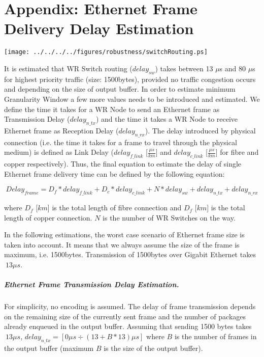 \chapter{Appendix: Ethernet Frame Delivery Delay Estimation}
\label{appH}

\begin{center}
	\texttt{[image: ../../../../figures/robustness/switchRouting.ps]}
	\label{fig:swRouting}
\end{center}

It is estimated that WR Switch routing ($delay_{sw}$) takes between
13 $\mu$s and 80 $\mu$s for highest priority traffic (size: 1500bytes), provided
no traffic congestion occurs and depending on the size of output buffer. In
order to estimate minimum Granularity Window a few more values needs to be
introduced and estimated. We define the time it takes for a WR Node to send an
Ethernet frame as Transmission Delay ($delay_{n\_tx}$) and the time it takes a
WR Node to receive Ethernet frame as Reception Delay ($delay_{n\_rx}$). The
delay introduced by physical connection (i.e. the time it takes for a frame to
travel through the physical medium) is defined as Link Delay ($delay_{f\_link}$
[$\frac{\mu s}{km}$] and $delay_{c\_link}$ [$\frac{\mu s}{km}$] for fibre and
copper respectively). Thus, the final equation to estimate the delay of single
Ethernet frame delivery time can be defined by the following equation:

\begin{equation}
	Delay_{frame} = D_{f} * delay_{f\_link} + D_{c} * delay_{c\_link} + 
	N * delay_{sw} + delay_{n\_tx} + delay_{n\_rx}
\end{equation}	    

where $D_f$ [$km$] is the total length of fibre connection and $D_f$ [$km$] is
the total length of copper connection. $N$ is the number of WR Switches on
the way.

In the following estimations, the worst case scenario of Ethernet frame size is
taken into account. It means that we always assume the size of the frame is
maximum, i.e. 1500bytes. Transmission of 1500bytes over Gigabit Ethernet takes
$~13\mu s$. 


\paragraph{Ethernet Frame Transmission Delay Estimation.} 

For simplicity, no encoding is assumed. The delay of frame transmission depends
on the remaining size of the currently sent frame and the number of packages
already enqueued in the output buffer. Assuming that sending 1500 bytes takes
$~13\mu s$, $delay_{n\_tx}= [ 0 \mu s \div (13 + B * 13)\mu s]$
where $B$ is the number of frames in the output buffer (maximum $B$ is the size
of the output buffer). 

